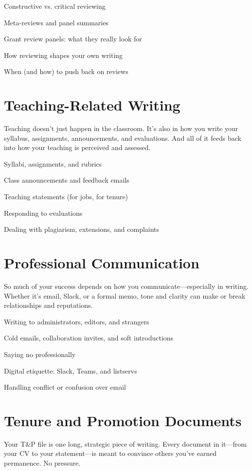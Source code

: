 \documentclass[oneside,11pt,dvipsnames]{book}
\begin{document}
Constructive vs. critical reviewing

Meta-reviews and panel summaries

Grant review panels: what they really look for

How reviewing shapes your own writing

When (and how) to push back on reviews

\chapter{Teaching-Related Writing}

Teaching doesn’t just happen in the classroom. It’s also in how you write your syllabus, assignments, announcements, and evaluations. And all of it feeds back into how your teaching is perceived and assessed.

Syllabi, assignments, and rubrics

Class announcements and feedback emails

Teaching statements (for jobs, for tenure)

Responding to evaluations

Dealing with plagiarism, extensions, and complaints



\chapter{Professional Communication}

So much of your success depends on how you communicate—especially in writing. Whether it's email, Slack, or a formal memo, tone and clarity can make or break relationships and reputations.

Writing to administrators, editors, and strangers

Cold emails, collaboration invites, and soft introductions

Saying no professionally

Digital etiquette: Slack, Teams, and listservs

Handling conflict or confusion over email

\chapter{Tenure and Promotion Documents}

Your T\&P file is one long, strategic piece of writing. Every document in it—from your CV to your statement—is meant to convince others you’ve earned permanence. No pressure.
\end{document}
